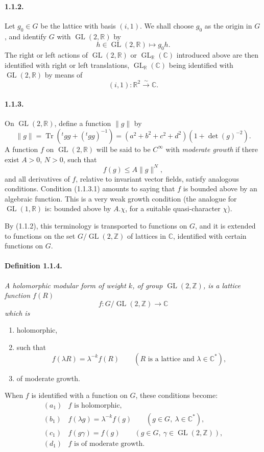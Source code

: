 \documentclass[10pt,a4paper]{article}
\providecommand{\GL}{\operatorname{GL}}
\providecommand{\Tr}{\operatorname{Tr}}
\providecommand{\R}{\mathbb R}
\providecommand{\Z}{\mathbb Z}
\providecommand{\C}{\mathbb C}
\providecommand{\iso}{\xrightarrow{\sim}}
\begin{document}
\paragraph{1.1.2.} Let $g_0\in G$ be the lattice with basis $(i,1)$. We shall choose $g_0$ as the origin in $G$, and identify $G$ with $\GL(2,\R)$ by
\[
h\in\GL(2,\R)\longmapsto g_0h.
\]
The right or left actions of $\GL(2,\R)$ or $\GL_{\R}(\C)$ introduced above are then identified with right or left translations, $\GL_{\R}(\C)$ being identified with $\GL(2,\R)$ by means of
\[
(i,1):\R^2\iso\C.
\]

\paragraph{1.1.3.} On $\GL(2,\R)$, define a function $\|g\|$ by
\[
\|g\|=\Tr({}^{t}gg+({}^{t}gg)^{-1})
=(a^2+b^2+c^2+d^2)(1+\det(g)^{-2}).
\]
A function $f$ on $\GL(2,\R)$ will be said to be $C^\infty$ with \emph{moderate growth} if there exist $A>0$, $N>0$, such that
\[
\tag{1.1.3.1}
f(g)\le A\|g\|^N,
\]
and all derivatives of $f$, relative to invariant vector fields, satisfy analogous conditions. Condition (1.1.3.1) amounts to saying that $f$ is bounded above by an algebraic function. This is a very weak growth condition (the analogue for $\GL(1,\R)$ is: bounded above by $A.\chi$, for a suitable quasi-character $\chi$).

By (1.1.2), this terminology is transported to functions on $G$, and it is extended to functions on the set $G/\GL(2,\Z)$ of lattices in $\C$, identified with certain functions on $G$.

\paragraph{Definition 1.1.4.}{\itshape  A holomorphic modular form of weight $k$, of group $\GL(2,\Z)$, is a lattice function $f(R)$
\[
f:G/\GL(2,\Z)\longrightarrow\C
\]
which is\par}

\clearpage
{}
\hypertarget{authority-11}{}
{\itshape \begin{enumerate}[label=(\alph*)]
\item holomorphic,
\item such that
\[
f(\lambda R)=\lambda^{-k}f(R)\qquad(R\text{ is a lattice and }\lambda\in\C^*),
\]
\item[(d)] of moderate growth.
\end{enumerate}
\par}
When \(f\) is identified with a function on \(G\), these conditions become:
\[
\begin{array}{ll}
(a_1)& f\text{ is holomorphic},\\[0.25em]
(b_1)& f(\lambda g)=\lambda^{-k}f(g)\qquad(g\in G,\ \lambda\in\C^*),\\[0.25em]
(c_1)& f(g\gamma)=f(g)\qquad(g\in G,\ \gamma\in\GL(2,\Z)),\\[0.25em]
(d_1)& f\text{ is of moderate growth.}
\end{array}
\]
\end{document}
